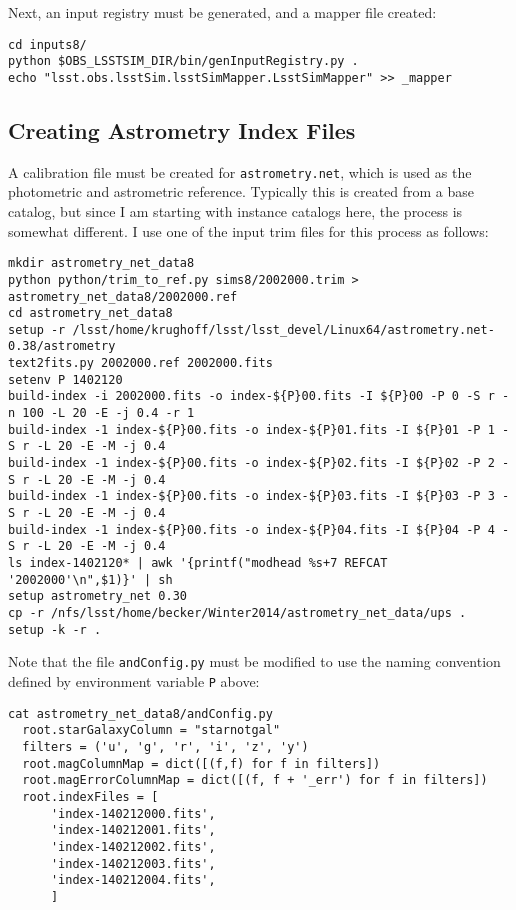 \documentclass[prd, nofootinbib, floatfix, 11pt, tightenlines, times]{article}
\begin{document}
\begin{appendices}
Next, an input registry must be generated, and a mapper file created:

{\small
\begin{Verbatim}[frame=single]
cd inputs8/
python $OBS_LSSTSIM_DIR/bin/genInputRegistry.py .
echo "lsst.obs.lsstSim.lsstSimMapper.LsstSimMapper" >> _mapper
\end{Verbatim}
}

\subsection{Creating Astrometry Index Files}

A calibration file must be created for {\tt astrometry.net}, which is
used as the photometric and astrometric reference.  Typically this is
created from a base catalog, but since I am starting with instance
catalogs here, the process is somewhat different.  I use one of the
input trim files for this process as follows: 

{\footnotesize
\begin{Verbatim}[frame=single]
mkdir astrometry_net_data8
python python/trim_to_ref.py sims8/2002000.trim > astrometry_net_data8/2002000.ref
cd astrometry_net_data8
setup -r /lsst/home/krughoff/lsst/lsst_devel/Linux64/astrometry.net-0.38/astrometry
text2fits.py 2002000.ref 2002000.fits
setenv P 1402120
build-index -i 2002000.fits -o index-${P}00.fits -I ${P}00 -P 0 -S r -n 100 -L 20 -E -j 0.4 -r 1
build-index -1 index-${P}00.fits -o index-${P}01.fits -I ${P}01 -P 1 -S r -L 20 -E -M -j 0.4 
build-index -1 index-${P}00.fits -o index-${P}02.fits -I ${P}02 -P 2 -S r -L 20 -E -M -j 0.4 
build-index -1 index-${P}00.fits -o index-${P}03.fits -I ${P}03 -P 3 -S r -L 20 -E -M -j 0.4 
build-index -1 index-${P}00.fits -o index-${P}04.fits -I ${P}04 -P 4 -S r -L 20 -E -M -j 0.4 
ls index-1402120* | awk '{printf("modhead %s+7 REFCAT '2002000'\n",$1)}' | sh     
setup astrometry_net 0.30  
cp -r /nfs/lsst/home/becker/Winter2014/astrometry_net_data/ups .
setup -k -r .
\end{Verbatim}
}

Note that the file {\tt andConfig.py} must be modified to use the
naming convention defined by environment variable {\tt P} above:

{\small
\begin{Verbatim}[frame=single]
cat astrometry_net_data8/andConfig.py 
  root.starGalaxyColumn = "starnotgal"
  filters = ('u', 'g', 'r', 'i', 'z', 'y')
  root.magColumnMap = dict([(f,f) for f in filters])
  root.magErrorColumnMap = dict([(f, f + '_err') for f in filters])
  root.indexFiles = [
      'index-140212000.fits',  
      'index-140212001.fits',  
      'index-140212002.fits',  
      'index-140212003.fits',
      'index-140212004.fits',
      ]
\end{Verbatim}
}


\end{appendices}
\end{document}

